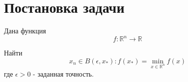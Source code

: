 \section{Постановка задачи}
\label{sec:problem}
\noindent Дана функция
\begin{equation}
    f:\mathbb{R}^{n} \rightarrow \mathbb{R}
\end{equation}

\noindent Найти
\begin{equation}
    x_n \in B(\epsilon, x_*):  f(x_*) = \min_{x \in \mathbb{R}^{n}} f(x)
\end{equation}
\noindent где $\epsilon > 0$ - заданная точность.